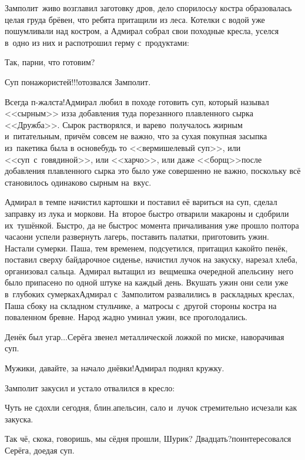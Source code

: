 Замполит~живо возглавил заготовку дров, дело спорилось\mdash у костра образовалась целая груда брёвен, что ребята притащили из леса. Котелки с водой уже пошумливали над костром, а Адмирал собрал свои походные кресла, уселся в~одно из них и распотрошил герму с~продуктами:

\diagdash Так, парни, что готовим?

\diagdash Суп понажористей!!!\mdash отозвался Замполит.

\diagdash Всегда п-жалста!\mdash Адмирал любил в походе готовить суп, который называл <<сырным>> из\sdash за добавления туда порезанного плавленного сырка <<Дружба>>. Сырок растворялся, и варево~получалось жирным и~питательным, причём совсем не важно, что за сухая покупная засыпка из~пакетика была в основе\mdash будь то <<вермишелевый суп>>, или <<суп~с~говядиной>>, или <<харчо>>, или даже <<борщ>>\mdash после добавления плавленного сырка это было уже совершенно не важно, поскольку всё становилось одинаково сырным на~вкус.

Адмирал в темпе начистил картошки и поставил её вариться на суп, сделал заправку из лука и моркови. На~второе быстро отварили макароны и сдобрили их~тушёнкой. Быстро, да не быстро\mdash с момента причаливания уже прошло полтора часа\mdash они успели развернуть лагерь, поставить палатки, приготовить ужин. Настали сумерки. Паша, тем временем, подсуетился, притащил какой\sdash то пенёк, поставил сверху байдарочное сиденье, начистил лучок на закуску, нарезал хлеба, организовал сальца. Адмирал вытащил из~вещмешка очередной апельсин\mdash у~него было припасено по одной штуке на каждый день. Вкушать ужин они сели уже в~глубоких сумерках\mdash Адмирал с~Замполитом развалились в~раскладных креслах, Паша сбоку на складном стульчике, а~матросы с~другой стороны костра на поваленном бревне. Народ жадно уминал ужин, все проголодались.

\diagdash Денёк был угар$\ldots$\mdash Серёга звенел металлической ложкой по миске, наворачивая суп.%

\diagdash Мужики, давайте, за начало днёвки!\mdash Адмирал поднял кружку.


Замполит закусил и устало отвалился в кресло:

\diagdash Чуть не сдохли сегодня, блин.\mdash апельсин, сало и~лучок стремительно исчезали как закуска.

\diagdash Так чё, скока, говоришь, мы сёдня прошли, Шурик? Двадцать?\mdash поинтересовался Серёга, доедая суп.

